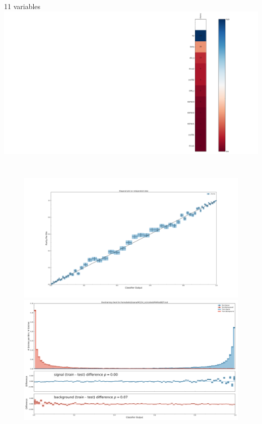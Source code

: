 \documentclass[12pt]{beamer}
\begin{document}
\begin{frame}{11 variables}
\hspace{-1in}
\includegraphics[width=1.25\textwidth]{evaluate_11/importance.pdf}
	\vspace{-3.3in}
	\begin{columns}
		\begin{figure}
			\includegraphics[width=1.0\textwidth]{evaluate_11/diagonal_plot_test.pdf}
			\includegraphics[width=1.0\textwidth]{evaluate_11/overtraining_plot_-2246559386340646363.pdf}
		\end{figure}
		
	\end{columns}
\end{frame}
\end{document}
